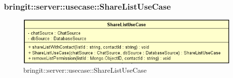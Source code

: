 \subsubsection{bringit::server::usecase::ShareListUseCase}

\label{bringit::server::usecase::ShareListUseCase}
\begin{figure}[H]
	\centering
	\includegraphics[scale=0.5]{Sezioni/SottosezioniST/img/app/ShareListUseCase.png}
	\caption{bringit::server::usecase::ShareListUseCase}
\end{figure}

